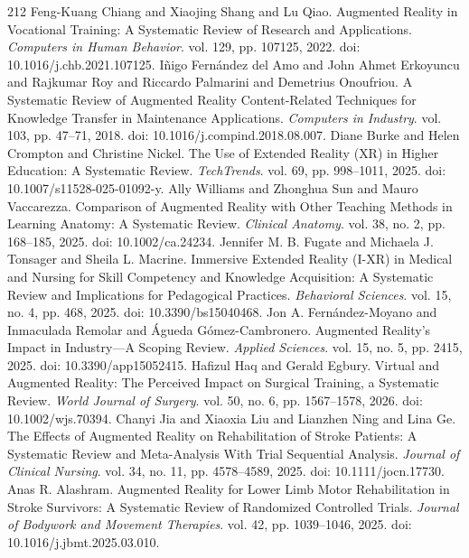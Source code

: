\begin{thebibliography}{212}
 Feng-Kuang Chiang and Xiaojing Shang and Lu Qiao. Augmented Reality in Vocational Training: A Systematic Review of Research and Applications. \emph{Computers in Human Behavior}. vol. 129, pp. 107125, 2022. doi: 10.1016/j.chb.2021.107125.
 I{\~n}igo Fern{\'a}ndez del Amo and John Ahmet Erkoyuncu and Rajkumar Roy and Riccardo Palmarini and Demetrius Onoufriou. A Systematic Review of Augmented Reality Content-Related Techniques for Knowledge Transfer in Maintenance Applications. \emph{Computers in Industry}. vol. 103, pp. 47--71, 2018. doi: 10.1016/j.compind.2018.08.007.
 Diane Burke and Helen Crompton and Christine Nickel. The Use of Extended Reality ({XR}) in Higher Education: A Systematic Review. \emph{TechTrends}. vol. 69, pp. 998--1011, 2025. doi: 10.1007/s11528-025-01092-y.
 Ally Williams and Zhonghua Sun and Mauro Vaccarezza. Comparison of Augmented Reality with Other Teaching Methods in Learning Anatomy: A Systematic Review. \emph{Clinical Anatomy}. vol. 38, no. 2, pp. 168--185, 2025. doi: 10.1002/ca.24234.
 Jennifer M. B. Fugate and Michaela J. Tonsager and Sheila L. Macrine. Immersive Extended Reality ({I-XR}) in Medical and Nursing for Skill Competency and Knowledge Acquisition: A Systematic Review and Implications for Pedagogical Practices. \emph{Behavioral Sciences}. vol. 15, no. 4, pp. 468, 2025. doi: 10.3390/bs15040468.
 Jon A. Fern{\'a}ndez-Moyano and Inmaculada Remolar and {\'A}gueda G{\'o}mez-Cambronero. Augmented Reality's Impact in Industry---A Scoping Review. \emph{Applied Sciences}. vol. 15, no. 5, pp. 2415, 2025. doi: 10.3390/app15052415.
 Hafizul Haq and Gerald Egbury. Virtual and Augmented Reality: The Perceived Impact on Surgical Training, a Systematic Review. \emph{World Journal of Surgery}. vol. 50, no. 6, pp. 1567--1578, 2026. doi: 10.1002/wjs.70394.
 Chanyi Jia and Xiaoxia Liu and Lianzhen Ning and Lina Ge. The Effects of Augmented Reality on Rehabilitation of Stroke Patients: A Systematic Review and Meta-Analysis With Trial Sequential Analysis. \emph{Journal of Clinical Nursing}. vol. 34, no. 11, pp. 4578--4589, 2025. doi: 10.1111/jocn.17730.
 Anas R. Alashram. Augmented Reality for Lower Limb Motor Rehabilitation in Stroke Survivors: A Systematic Review of Randomized Controlled Trials. \emph{Journal of Bodywork and Movement Therapies}. vol. 42, pp. 1039--1046, 2025. doi: 10.1016/j.jbmt.2025.03.010.

\end{thebibliography}
